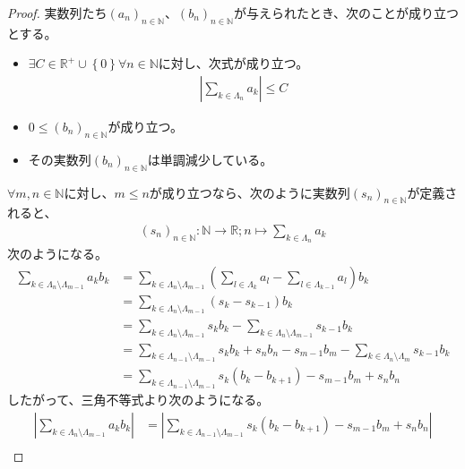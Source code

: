 \documentclass[dvipdfmx]{jsarticle}
\begin{document}
\begin{proof}
実数列たち$\left( a_{n} \right)_{n \in \mathbb{N}}$、$\left( b_{n} \right)_{n \in \mathbb{N}}$が与えられたとき、次のことが成り立つとする。
\begin{itemize}
\item
  $\exists C \in \mathbb{R}^{+} \cup \left\{ 0 \right\}\forall n \in \mathbb{N}$に対し、次式が成り立つ。
\begin{align*}
\left| \sum_{k \in \varLambda_{n}} a_{k} \right| \leq C
\end{align*}
\item
  $0 \leq \left( b_{n} \right)_{n \in \mathbb{N}}$が成り立つ。
\item
  その実数列$\left( b_{n} \right)_{n \in \mathbb{N}}$は単調減少している。
\end{itemize}
$\forall m,n \in \mathbb{N}$に対し、$m \leq n$が成り立つなら、次のように実数列$\left( s_{n} \right)_{n \in \mathbb{N}}$が定義されると、
\begin{align*}
\left( s_{n} \right)_{n \in \mathbb{N}}:\mathbb{N} \rightarrow \mathbb{R};n \mapsto \sum_{k \in \varLambda_{n}} a_{k}
\end{align*}
次のようになる。
\begin{align*}
\sum_{k \in \varLambda_{n} \setminus \varLambda_{m - 1}} {a_{k}b_{k}} &= \sum_{k \in \varLambda_{n} \setminus \varLambda_{m - 1}} {\left( \sum_{l \in \varLambda_{k}} a_{l} - \sum_{l \in \varLambda_{k - 1}} a_{l} \right)b_{k}}\\
&= \sum_{k \in \varLambda_{n} \setminus \varLambda_{m - 1}} {\left( s_{k} - s_{k - 1} \right)b_{k}}\\
&= \sum_{k \in \varLambda_{n} \setminus \varLambda_{m - 1}} {s_{k}b_{k}} - \sum_{k \in \varLambda_{n} \setminus \varLambda_{m - 1}} {s_{k - 1}b_{k}}\\
&= \sum_{k \in \varLambda_{n - 1} \setminus \varLambda_{m - 1}} {s_{k}b_{k}} + s_{n}b_{n} - s_{m - 1}b_{m} - \sum_{k \in \varLambda_{n} \setminus \varLambda_{m}} {s_{k - 1}b_{k}}\\
&= \sum_{k \in \varLambda_{n - 1} \setminus \varLambda_{m - 1}} {s_{k}\left( b_{k} - b_{k + 1} \right)} - s_{m - 1}b_{m} + s_{n}b_{n}
\end{align*}
したがって、三角不等式より次のようになる。
\begin{align*}
\left| \sum_{k \in \varLambda_{n} \setminus \varLambda_{m - 1}} {a_{k}b_{k}} \right| &= \left| \sum_{k \in \varLambda_{n - 1} \setminus \varLambda_{m - 1}} {s_{k}\left( b_{k} - b_{k + 1} \right)} - s_{m - 1}b_{m} + s_{n}b_{n} \right|\\

\end{align*}
\end{proof}
\end{document}
